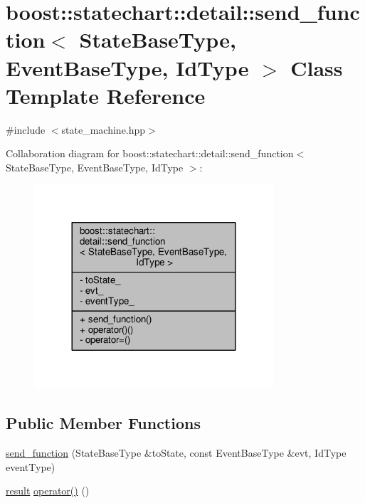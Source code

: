 \hypertarget{classboost_1_1statechart_1_1detail_1_1send__function}{}\section{boost\+:\+:statechart\+:\+:detail\+:\+:send\+\_\+function$<$ State\+Base\+Type, Event\+Base\+Type, Id\+Type $>$ Class Template Reference}
\label{classboost_1_1statechart_1_1detail_1_1send__function}


{\ttfamily \#include $<$state\+\_\+machine.\+hpp$>$}



Collaboration diagram for boost\+:\+:statechart\+:\+:detail\+:\+:send\+\_\+function$<$ State\+Base\+Type, Event\+Base\+Type, Id\+Type $>$\+:
\nopagebreak
\begin{figure}[H]
\begin{center}
\leavevmode
\includegraphics[width=252pt]{classboost_1_1statechart_1_1detail_1_1send__function__coll__graph}
\end{center}
\end{figure}
\subsection*{Public Member Functions}
\begin{DoxyCompactItemize}
\item 
\mbox{\hyperlink{classboost_1_1statechart_1_1detail_1_1send__function_a9fb0b72962c94b35cf4757ab111e6c88}{send\+\_\+function}} (State\+Base\+Type \&to\+State, const Event\+Base\+Type \&evt, Id\+Type event\+Type)
\item 
\mbox{\hyperlink{namespaceboost_1_1statechart_abe807f6598b614d6d87bb951ecd92331}{result}} \mbox{\hyperlink{classboost_1_1statechart_1_1detail_1_1send__function_a129380b34d86c3e11ce9688e208e32ca}{operator()}} ()
\end{DoxyCompactItemize}
